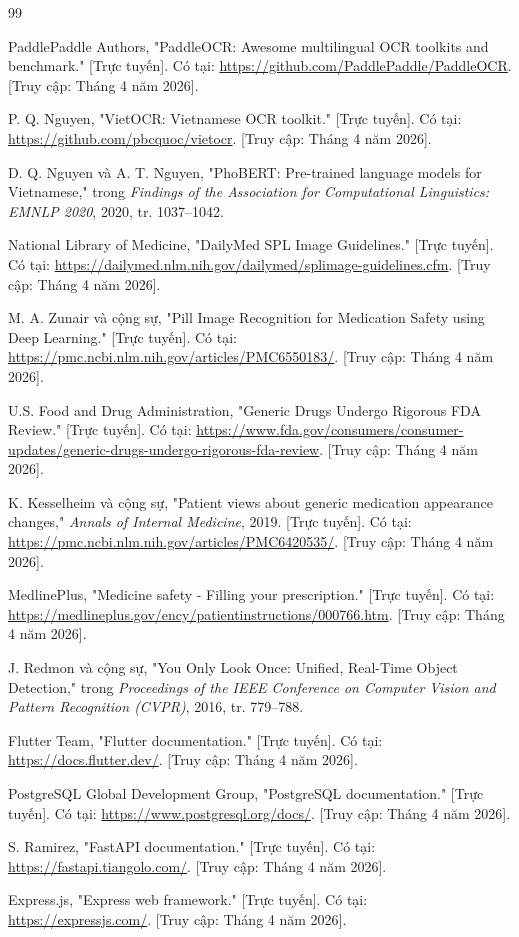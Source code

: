 \documentclass[12pt,a4paper]{report}
\begin{document}
\begin{thebibliography}{99}

PaddlePaddle Authors, "PaddleOCR: Awesome multilingual OCR toolkits and benchmark." [Trực tuyến]. Có tại: \url{https://github.com/PaddlePaddle/PaddleOCR}. [Truy cập: Tháng 4 năm 2026].

P. Q. Nguyen, "VietOCR: Vietnamese OCR toolkit." [Trực tuyến]. Có tại: \url{https://github.com/pbcquoc/vietocr}. [Truy cập: Tháng 4 năm 2026].

D. Q. Nguyen và A. T. Nguyen, "PhoBERT: Pre-trained language models for Vietnamese," trong \textit{Findings of the Association for Computational Linguistics: EMNLP 2020}, 2020, tr. 1037--1042.

National Library of Medicine, "DailyMed SPL Image Guidelines." [Trực tuyến]. Có tại: \url{https://dailymed.nlm.nih.gov/dailymed/splimage-guidelines.cfm}. [Truy cập: Tháng 4 năm 2026].

M. A. Zunair và cộng sự, "Pill Image Recognition for Medication Safety using Deep Learning." [Trực tuyến]. Có tại: \url{https://pmc.ncbi.nlm.nih.gov/articles/PMC6550183/}. [Truy cập: Tháng 4 năm 2026].

U.S. Food and Drug Administration, "Generic Drugs Undergo Rigorous FDA Review." [Trực tuyến]. Có tại: \url{https://www.fda.gov/consumers/consumer-updates/generic-drugs-undergo-rigorous-fda-review}. [Truy cập: Tháng 4 năm 2026].

K. Kesselheim và cộng sự, "Patient views about generic medication appearance changes," \textit{Annals of Internal Medicine}, 2019. [Trực tuyến]. Có tại: \url{https://pmc.ncbi.nlm.nih.gov/articles/PMC6420535/}. [Truy cập: Tháng 4 năm 2026].

MedlinePlus, "Medicine safety - Filling your prescription." [Trực tuyến]. Có tại: \url{https://medlineplus.gov/ency/patientinstructions/000766.htm}. [Truy cập: Tháng 4 năm 2026].

J. Redmon và cộng sự, "You Only Look Once: Unified, Real-Time Object Detection," trong \textit{Proceedings of the IEEE Conference on Computer Vision and Pattern Recognition (CVPR)}, 2016, tr. 779--788.

Flutter Team, "Flutter documentation." [Trực tuyến]. Có tại: \url{https://docs.flutter.dev/}. [Truy cập: Tháng 4 năm 2026].

PostgreSQL Global Development Group, "PostgreSQL documentation." [Trực tuyến]. Có tại: \url{https://www.postgresql.org/docs/}. [Truy cập: Tháng 4 năm 2026].

S. Ramirez, "FastAPI documentation." [Trực tuyến]. Có tại: \url{https://fastapi.tiangolo.com/}. [Truy cập: Tháng 4 năm 2026].

Express.js, "Express web framework." [Trực tuyến]. Có tại: \url{https://expressjs.com/}. [Truy cập: Tháng 4 năm 2026].

\end{thebibliography}
\end{document}
